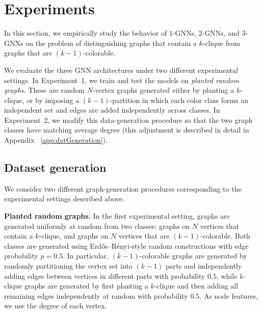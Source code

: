 \section{Experiments}\label{sec:Experiments}
In this section, we empirically study the behavior of $1$-GNNs, $2$-GNNs, and $3$-GNNs on the problem of distinguishing graphs that contain a $k$-clique from graphs that are $(k\!-\!1)$-colorable. 

We evaluate the three GNN architectures under two different experimental settings. In Experiment~1, we train and test the models on \emph{planted random graphs}. These are random $N$-vertex graphs generated either by planting a $k$-clique, or by imposing a $(k\!-\!1)$-partition in which each color class forms an independent set and edges are added independently across classes. In Experiment~2, we modify this data-generation procedure so that the two graph classes have matching average degree (this adjustment is described in detail in Appendix ~\ref{app:datGeneration}). 


\subsection{Dataset generation}\label{subsec:DataGeneration}

We consider two different graph-generation procedures corresponding to the experimental settings described above.

\textbf{Planted random graphs.} 
In the first experimental setting, graphs are generated uniformly at random from two classes: graphs on $N$ vertices that contain a $k$-clique, and graphs on $N$ vertices that are $(k\!-\!1)$-colorable. Both classes are generated using Erd\H{o}s--R\'enyi-style random constructions with edge probability $p=0.5$. In particular, $(k\!-\!1)$-colorable graphs are generated by randomly partitioning the vertex set into $(k\!-\!1)$ parts and independently adding edges between vertices in different parts with probability $0.5$, while $k$-clique graphs are generated by first planting a $k$-clique and then adding all remaining edges independently at random with probability $0.5$. As node features, we use the degree of each vertex.




